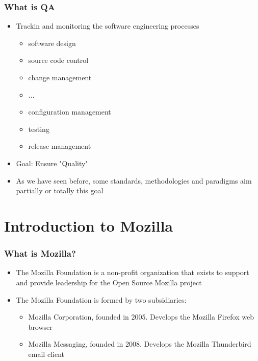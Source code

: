 \documentclass{beamer}
\begin{document}
\begin{frame}
\frametitle{What is QA}
\begin{itemize}
\item Trackin and monitoring the software engineering processes
    \begin{itemize}
       \item software design 
       \item source code control 
       \item change management 
       \item ...
       \item configuration management 
       \item testing 
       \item release management
    \end{itemize}
\item Goal: Ensure "Quality"
\item As we have seen before, some standards, methodologies and paradigms aim partially or totally this goal
\end{itemize}
\end{frame}


\section{Introduction to Mozilla}


\begin{frame}
\frametitle{What is Mozilla?}
 \begin{itemize}
 \item The Mozilla Foundation is a non-profit organization that exists to support and provide leadership for the Open Source Mozilla project
 \item The Mozilla Foundation is formed by two subsidiaries:
     \begin{itemize}
     \item Mozilla Corporation, founded in 2005. Develops the Mozilla Firefox web browser
     \item Mozilla Messaging, founded in 2008. Develops the Mozilla Thunderbird email client
     \end{itemize}

 \end{itemize}
\end{frame}
\end{document}
